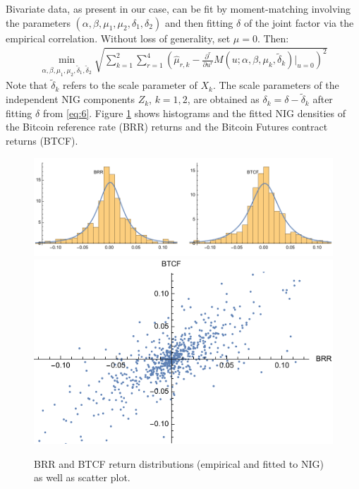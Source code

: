 Bivariate data, as present in our case, can be
fit by moment-matching involving the parameters $(\alpha, \beta,
\mu_1, \mu_2, \delta_1, \delta_2)$ and then fitting $\delta$ of the
joint factor via the empirical correlation. Without loss of
generality, set $\mu=0$. Then:
\begin{align*}
  \min_{\alpha, \beta, \mu_1, \mu_2, \tilde\delta_1, \tilde\delta_2}
  \sqrt{\sum_{k=1}^2 \sum_{r=1}^4
  \left(\hat\mu_{r,k}-\frac{\partial^r}{\partial u^r} M(u; \alpha, \beta,
  \mu_k, \tilde\delta_k)\Big|_{u=0}\right)^2}
\end{align*}
Note that $\tilde\delta_k$ refers to the scale parameter of
$X_k$. The scale parameters of the independent NIG components $Z_k$,
$k=1,2$, are obtained as $\delta_k=\delta-\tilde \delta_k$ after
fitting $\delta$ from \eqref{eq:6}. Figure \ref{fig:nig} shows
histograms and the fitted NIG densities of the Bitcoin reference rate
(BRR) returns and the Bitcoin Futures contract returns (BTCF). 


\begin{figure}[t]
  \centering
  \includegraphics[scale=.7]{_pics/fittedNIG.pdf} 
  \includegraphics[scale=.7]{_pics/scatter.pdf}
  \caption{BRR and BTCF return distributions (empirical and fitted to
    NIG) as well as scatter plot.}
  \label{fig:nig}
\end{figure}

